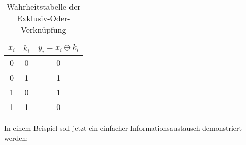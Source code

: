 \begin{table}
  \centering
  \caption{Wahrheitstabelle der Exklusiv-Oder-Verknüpfung}
  \begin{tabular}{cc|c}
    $x_i$ & $k_i$ & $y_i = x_i \oplus k_i$ \\ \hline
    0     & 0     & 0                      \\
    0     & 1     & 1                      \\ \hline
    1     & 0     & 1                      \\
    1     & 1     & 0                      \\
  \end{tabular}
  \label{tab:truth-table-xor}
\end{table}



\noindent
In einem Beispiel soll jetzt ein einfacher Informationsaustausch demonstriert werden:

\newcommand{\streamencryption}{
  \begin{aligned}
    x_0,\dots,x_7 = 01010 & 000_2 = 80_{10} = \text{\texttt{P}}  \\
    \oplus                &                                      \\
    k_0,\dots,k_7 = 00111 & 010_2                                \\
    y_0,\dots,y_7 = 01101 & 010_2 = 106_{10} = \text{\texttt{j}}
  \end{aligned}
}

\newcommand{\streamdecryption}{
  \begin{aligned}
    y_0,\dots,y_7 = 01101 & 010_2 = 106_{10} = \text{\texttt{j}} \\
    \oplus                &                                      \\
    k_0,\dots,k_7 = 00111 & 010_2                                \\
    x_0,\dots,x_7 = 01010 & 000_2 = 80_{10} = \text{\texttt{P}}
  \end{aligned}
}

\newcommand{\streamarrow}{\tikz{\draw[->] (0,0) to
    node[above] {$\text{\texttt{j}} = 01101010_2$} (2,0);}}

